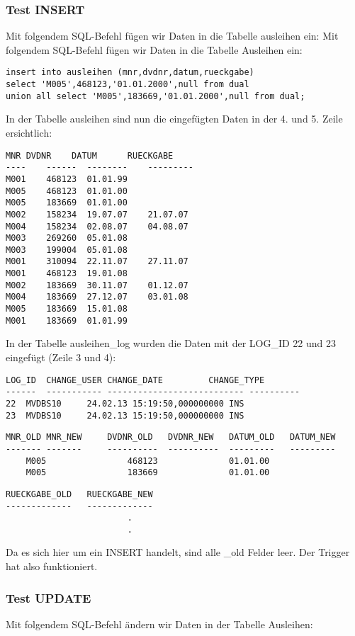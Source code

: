 \documentclass[11pt,a4paper,parskip=half]{scrartcl}
\begin{document}
\subsubsection{Test INSERT}
Mit folgendem SQL-Befehl fügen wir Daten in die Tabelle ausleihen ein:
Mit folgendem SQL-Befehl fügen wir Daten in die Tabelle Ausleihen ein:

\begin{lstlisting}
insert into ausleihen (mnr,dvdnr,datum,rueckgabe) 
select 'M005',468123,'01.01.2000',null from dual
union all select 'M005',183669,'01.01.2000',null from dual;
\end{lstlisting}

In der Tabelle ausleihen sind nun die eingefügten Daten in der 4. und 5. Zeile ersichtlich:

\begin{lstlisting}
MNR	DVDNR	 DATUM		RUECKGABE
---- 	------	-------- 	---------
M001	468123 	01.01.99	
M005	468123	01.01.00	
M005	183669	01.01.00	
M002	158234 	19.07.07	21.07.07  
M004	158234 	02.08.07	04.08.07  
M003	269260 	05.01.08	
M003	199004 	05.01.08	
M001	310094 	22.11.07	27.11.07  
M001	468123 	19.01.08	
M002	183669 	30.11.07	01.12.07  
M004	183669 	27.12.07	03.01.08  
M005	183669 	15.01.08	
M001	183669	01.01.99	
\end{lstlisting}

In der Tabelle ausleihen\_log wurden die Daten mit der LOG\_ID 22 und 23 eingefügt (Zeile 3 und 4):

\begin{lstlisting}
LOG_ID	CHANGE_USER	CHANGE_DATE			CHANGE_TYPE	
------	-----------	---------------------------	----------		
22	MVDBS10		24.02.13 15:19:50,000000000	INS					
23	MVDBS10		24.02.13 15:19:50,000000000	INS					
\end{lstlisting}

\begin{lstlisting}
MNR_OLD	MNR_NEW		DVDNR_OLD	DVDNR_NEW	DATUM_OLD	DATUM_NEW	
-------	-------		----------	----------	---------	--------- 	
	M005				468123				01.01.00					
	M005				183669				01.01.00					
\end{lstlisting}
\begin{lstlisting}
RUECKGABE_OLD	RUECKGABE_NEW
-------------	-------------	
						.
						.
\end{lstlisting}

Da es sich hier um ein INSERT handelt, sind alle \_old Felder leer. Der Trigger hat also funktioniert.

\subsubsection{Test UPDATE}
Mit folgendem SQL-Befehl ändern wir Daten in der Tabelle Ausleihen:
\end{document}
